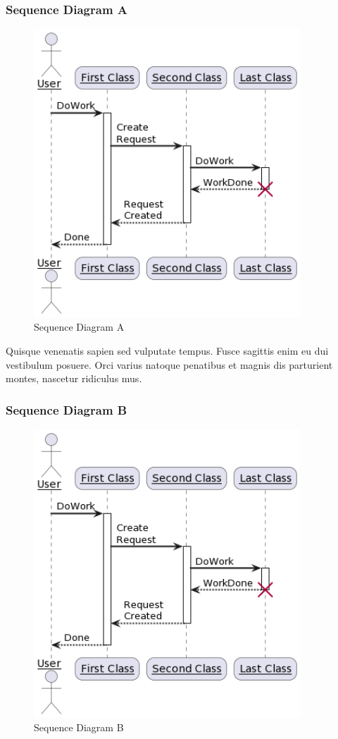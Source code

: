\subsubsection{Sequence Diagram A}
\begin{figure}[H]
    \centering
    \includegraphics[width=10cm]{assets/pics/dummy-sequence-diagram.png}
    \caption{Sequence Diagram A}
    \label{fig:sequenceDiagramA}
\end{figure}

Quisque venenatis sapien sed vulputate tempus. Fusce sagittis enim eu dui vestibulum posuere. Orci varius natoque penatibus et magnis dis parturient montes, nascetur ridiculus mus.

\subsubsection{Sequence Diagram B}
\begin{figure}[H]
    \centering
    \includegraphics[width=10cm]{assets/pics/dummy-sequence-diagram.png}
    \caption{Sequence Diagram B}
    \label{fig:sequenceDiagramB}
\end{figure}

